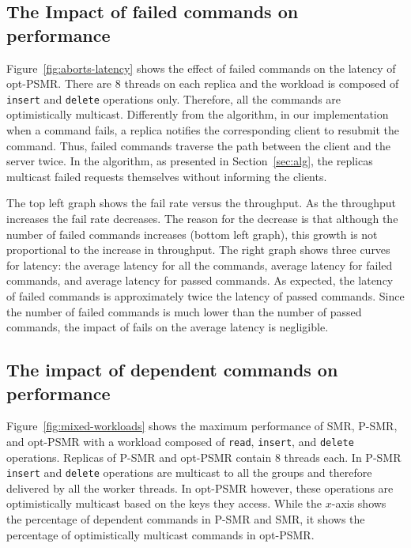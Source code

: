 \documentclass[conference]{IEEEtran}
\begin{document}
\subsection{The Impact of failed commands on performance}
\label{exp:aborts}


Figure~\ref{fig:aborts-latency} shows the effect of failed commands on the latency of opt-PSMR. 
There are 8 threads on each replica and the workload is composed of \texttt{insert} and \texttt{delete} operations only. 
Therefore, all the commands are optimistically multicast. 
Differently from the algorithm, in our implementation when a command fails, a replica notifies the corresponding client to resubmit the command. 
Thus, failed commands traverse the path between the client and the server twice. 
In the algorithm, as presented in Section~\ref{sec:alg}, the replicas multicast failed requests themselves without informing the clients.

The top left graph shows the fail rate versus the throughput. As the throughput increases the fail rate decreases. The reason for the decrease is that although the number of failed commands increases (bottom left graph), this growth is not proportional to the increase in throughput. The right graph shows three curves for latency: the average latency for all the commands, average latency for failed commands, and average latency for passed commands. As expected, the latency of failed commands is approximately twice the latency of passed commands. Since the number of failed commands is much lower than the number of passed commands, the impact of fails on the average latency is negligible. 



\subsection{The impact of dependent commands on performance}
\label{exp:mixed}


Figure~\ref{fig:mixed-workloads} shows the maximum performance of SMR, P-SMR, and opt-PSMR with a workload composed of \texttt{read}, \texttt{insert}, and \texttt{delete} operations. Replicas of P-SMR and opt-PSMR contain 8 threads each. In P-SMR \texttt{insert} and \texttt{delete} operations are multicast to all the groups and therefore delivered by all the worker threads. In opt-PSMR however, these operations are optimistically multicast based on the keys they access. While the $x$-axis shows the percentage of dependent commands in P-SMR and SMR, it shows the percentage of optimistically multicast commands in opt-PSMR. 
\end{document}

